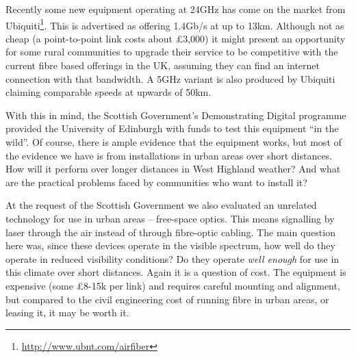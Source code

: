 \documentclass{amsart}
\begin{document}
Recently some new equipment operating at 24GHz has come on the market
from Ubiquiti\footnote{\href{http://www.ubnt.com/airfiber}{\url{http://www.ubnt.com/airfiber}}}.
This is advertised as offering 1.4Gb/s at up to 13km. Although not as
cheap (a point-to-point link costs about \pounds 3,000) it might present
an opportunity for some rural communities to upgrade their service to
be competitive with the current fibre based offerings in the UK,
assuming they can find an internet connection with that bandwidth. A
5GHz variant is also produced by Ubiquiti claiming comparable speeds
at upwards of 50km.

With this in mind, the Scottish Government's Demonstrating
Digital programme provided the University of Edinburgh with funds to
test this equipment ``in the wild''. Of course, there is ample evidence
that the equipment works, but most of the evidence we have is
from installations in urban areas over short distances. How will
it perform over longer distances in West Highland weather? And what
are the practical problems faced by communities who want to install it?

At the request of the Scottish Government we also evaluated an
unrelated technology for use in urban areas -- free-space optics. This
means signalling by laser through the air instead of through
fibre-optic cabling. The main question here was, since these devices
operate in the visible spectrum, how well do they operate in reduced
visibility conditions? Do they operate \emph{well enough} for use in
this climate over short distances. Again it is a question of cost. The
equipment is expensive (some \pounds 8-15k per link) and requires
careful mounting and alignment, but compared to the civil engineering
cost of running fibre in urban areas, or leasing it, it may be worth
it.

\clearpage

\clearpage

\end{document}
